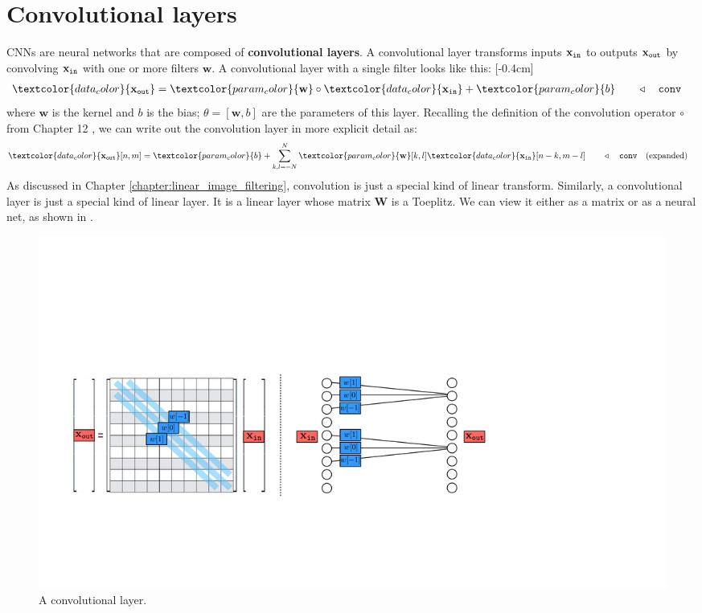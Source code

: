 \section{Convolutional layers}
CNNs are neural networks that are composed of {\bf convolutional layers}. A convolutional layer transforms inputs $\mathbf{x}_{\texttt{in}}$ to outputs $\mathbf{x}_{\texttt{out}}$ by convolving $\mathbf{x}_{\texttt{in}}$ with one or more filters $\mathbf{w}$. A convolutional layer with a single filter looks like this:
[-0.4cm]
\begin{align}
\textcolor{data_color}{\xout} = \textcolor{param_color}{\mathbf{w}} \circ \textcolor{data_color}{\xin} + \textcolor{param_color}{b} & \quad\quad \triangleleft \quad \texttt{conv}\label{eqn:convolutional_neural_nets:convolutional_filter}
\end{align}
where $\mathbf{w}$ is the kernel and $b$ is the bias; $\theta = [\mathbf{w}, b]$ are the parameters of this layer. Recalling the definition of the convolution operator $\circ$ from Chapter 12%
, we can write out the convolution layer in more explicit detail as:
\begin{align}
\textcolor{data_color}{\xout}[n,m] =
\textcolor{param_color}{b} + \sum_{k,l=-N}^N \textcolor{param_color}{\mathbf{w}}[k,l] \textcolor{data_color}{\xin}[n-k,m-l] & \quad\quad \triangleleft \quad \texttt{conv}\quad \text{(expanded)}\label{eqn:convolutional_neural_nets:convolutional_filter_expanded}
\end{align}
As discussed in Chapter \ref{chapter:linear_image_filtering}, convolution is just a special kind of linear transform. Similarly, a convolutional layer is just a special kind of linear layer. It is a linear layer whose matrix $\mathbf{W}$ is a Toeplitz. We can view it either as a matrix or as a neural net, as shown in \fig{\ref{fig:convolutional_neural_nets:conv_matrix_vs_net}}.
\begin{figure}[h]
\centerline{
    \includegraphics[width=1.0\linewidth]{./figures/convolutional_neural_nets/conv_matrix_vs_net.pdf}}
    \label{fig:convolutional_neural_nets:conv_matrix_vs_net}
    \caption{A convolutional layer.}
\end{figure}


